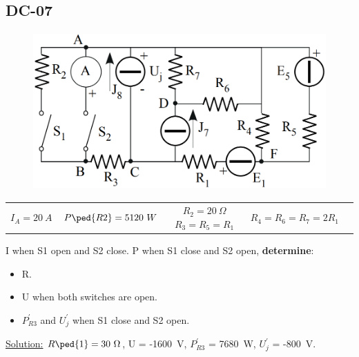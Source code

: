 \subsection{DC-07}
\begin{figure}[h]
\includegraphics[height=6cm]{img/1/07.png}
\centering
\end{figure}
\begin{center}
\begin{tabular}{ c c c c c}
  $I_A = 20 \ A$ & $P\ped{R2} = 5120\ W$ & $R_2 = 20 \ \Omega$
  $R_3 = R_5 = R_1$ & $R_4 = R_6 = R_7 = 2R_1$
\end{tabular}
\end{center}
I when S1 open and S2 close. P when S1 close and S2 open, \textbf{determine}:
\begin{itemize}
  \item R.
  \item U when both switches are open.
  \item $P^{'}_{R3}$ and $U^{'}_{j}$ when S1 close and S2 open.
\end{itemize}
\underline{\large{Solution:}}
\newline
$R\ped{1} = 30\ \Omega$, U = -1600\ V, $P^{'}_{R3}$ = 7680\ W, $U^{'}_{j}$ = -800\ V.
